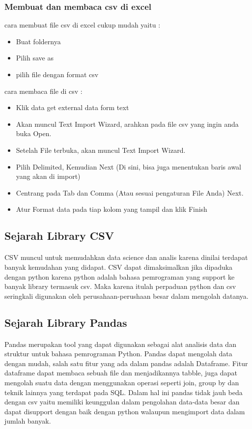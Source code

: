\subsubsection{Membuat dan membaca csv di excel}
cara membuat file csv di excel cukup mudah yaitu :
\begin{itemize}
	\item Buat foldernya
	\item Pilih save as
	\item pilih file dengan format csv
\end{itemize}
cara membaca file di csv :
\begin{itemize}
	\item Klik data get external data form text
	\item Akan muncul Text Import Wizard, arahkan pada file csv yang ingin anda buka Open.
	\item Setelah File terbuka, akan muncul Text Import Wizard.
	\item Pilih Delimited, Kemudian Next (Di sini, bisa juga menentukan baris awal yang akan di import)
	\item Centrang pada Tab dan Comma (Atau sesuai pengaturan File Anda) Next.
	\item Atur Format data pada tiap kolom yang tampil dan klik Finish
\end{itemize}
\subsection{Sejarah Library CSV}
\paragraph{}CSV muncul untuk memudahkan data science dan analis karena dinilai terdapat banyak kemudahan yang didapat. CSV dapat dimaksimalkan jika dipaduka dengan python karena python adalah bahasa pemrograman yang support ke banyak library termasuk csv. Maka karena itulah perpaduan python dan csv seringkali digunakan oleh perusahaan-perushaan besar dalam mengolah datanya.
\subsection{Sejarah Library Pandas}
\paragraph{}Pandas merupakan tool yang dapat digunakan sebagai alat analisis data dan struktur untuk bahasa pemrograman Python. Pandas dapat mengolah data dengan mudah, salah satu fitur yang ada dalam pandas adalah Dataframe. Fitur dataframe dapat membaca sebuah file dan menjadikannya tabble, juga dapat mengolah suatu data dengan menggunakan operasi seperti join, group by dan teknik lainnya yang terdapat pada SQL. Dalam hal ini pandas tidak jauh beda dengan csv yaitu memiliki keunggulan dalam pengolahan data-data besar dan dapat disupport dengan baik dengan python walaupun mengimport data dalam jumlah banyak.
